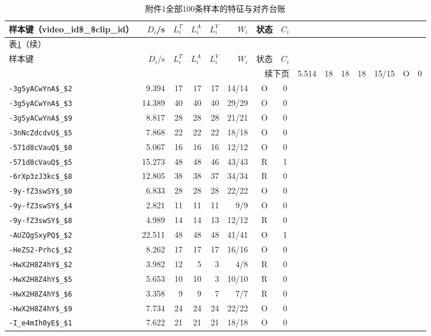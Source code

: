 {\footnotesize\setlength{\tabcolsep}{5pt}\renewcommand{\arraystretch}{1.02}
\begin{longtable}{lrrrrrcc}
\caption{附件1全部100条样本的特征与对齐台账}\label{tab:appA}\\
\toprule
样本键（video\_id\$\_\$clip\_id） & $D_i$/s & $L_i^T$ & $L_i^A$ & $L_i^V$ & $W_i$ & 状态 & $C_i$ \\
\midrule\endfirsthead
\multicolumn{8}{l}{表\ref{tab:appA}（续）}\\\toprule
样本键 & $D_i$/s & $L_i^T$ & $L_i^A$ & $L_i^V$ & $W_i$ & 状态 & $C_i$ \\\midrule\endhead
\bottomrule\multicolumn{8}{r}{续下页}\endfoot
\bottomrule\endlastfoot
\texttt{-3g5yACwYnA\$\_\$13} & 5.514 & 18 & 18 & 18 & 15/15 & O & 0 \\
\texttt{-3g5yACwYnA\$\_\$2} & 9.394 & 17 & 17 & 17 & 14/14 & O & 0 \\
\texttt{-3g5yACwYnA\$\_\$3} & 14.389 & 40 & 40 & 40 & 29/29 & O & 0 \\
\texttt{-3g5yACwYnA\$\_\$9} & 8.817 & 28 & 28 & 28 & 21/21 & O & 0 \\
\texttt{-3nNcZdcdvU\$\_\$5} & 7.868 & 22 & 22 & 22 & 18/18 & O & 0 \\
\texttt{-571d8cVauQ\$\_\$0} & 5.067 & 16 & 16 & 16 & 12/12 & O & 0 \\
\texttt{-571d8cVauQ\$\_\$5} & 15.273 & 48 & 48 & 46 & 43/43 & R & 1 \\
\texttt{-6rXp3zJ3kc\$\_\$8} & 12.805 & 38 & 38 & 37 & 34/34 & R & 0 \\
\texttt{-9y-fZ3swSY\$\_\$0} & 6.833 & 28 & 28 & 28 & 22/22 & O & 0 \\
\texttt{-9y-fZ3swSY\$\_\$4} & 2.821 & 11 & 11 & 11 & 9/9 & O & 0 \\
\texttt{-9y-fZ3swSY\$\_\$8} & 4.989 & 14 & 14 & 13 & 12/12 & R & 0 \\
\texttt{-AUZQgSxyPQ\$\_\$2} & 22.511 & 48 & 48 & 48 & 41/41 & O & 1 \\
\texttt{-HeZS2-Prhc\$\_\$2} & 8.262 & 17 & 17 & 17 & 16/16 & O & 0 \\
\texttt{-HwX2H8Z4hY\$\_\$2} & 3.982 & 12 & 5 & 3 & 4/8 & R & 0 \\
\texttt{-HwX2H8Z4hY\$\_\$5} & 5.653 & 10 & 10 & 3 & 10/10 & R & 0 \\
\texttt{-HwX2H8Z4hY\$\_\$6} & 3.358 & 9 & 9 & 7 & 7/7 & R & 0 \\
\texttt{-HwX2H8Z4hY\$\_\$9} & 7.734 & 24 & 24 & 24 & 22/22 & O & 0 \\
\texttt{-I\_e4mIh0yE\$\_\$1} & 7.622 & 21 & 21 & 21 & 18/18 & O & 0 \\

\end{longtable}}
